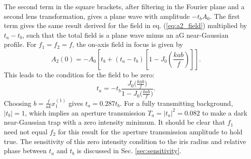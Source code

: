 The second term in the square brackets, after filtering in the Fourier plane and a second lens transformation, gives a plane wave with amplitude $-t_{b} A_{0}$. The first term gives the same result derived for the field in eq. (\ref{eq:a2_field}) multiplied by $t_{a}-t_{b}$, such that the total field is a plane wave minus an aG near-Gaussian profile. For $f_{1}=f_{2}=f$, the on-axis field in focus is given by
\begin{equation}\label{eq:darkcenter}
    A_{2}(0)=-A_{0}\left[t_{b}+\left(t_{a}-t_{b}\right)\left[1-J_{0}\left(\frac{k a b}{f}\right)\right]\right].
\end{equation}
This leads to the condition for the field to be zero:
\begin{equation}\label{eq:darkcondition}
    t_{a}=-t_{b} \frac{J_{0}\big(\frac{k a b}{f}\big)}{1-J_{0}\big(\frac{k a b}{f}\big)}.
\end{equation}
Choosing $b=\frac{f}{a k} x_1^{(1)}$ gives $t_a=0.287t_b$.
For a fully transmitting background, $\left| t_b \right|=1$, which implies an aperture transmission $T_a = \left| t_a \right| ^2=0.082$ to make a dark near-Gaussian trap with a zero intensity minimum. It should be clear that $f_1$ need not equal $f_2$ for this result for the aperture transmission amplitude to hold true. The sensitivity of this zero intensity condition to the iris radius and relative phase between $t_a$ and $t_b$ is discussed in Sec. \ref{sec:sensitivity}. 

